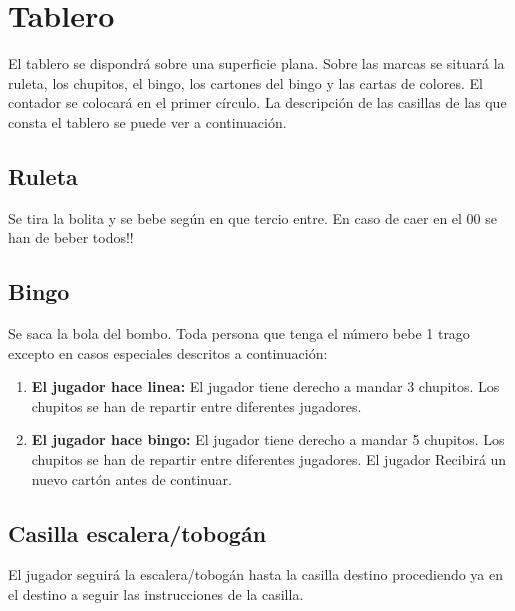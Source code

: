 \documentclass[10pt,a5paper]{article}
\begin{document}
\section{Tablero}\label{sec:casillas}
El tablero se dispondrá sobre una superficie plana. Sobre las marcas se situará la ruleta, los chupitos, el bingo, los cartones del bingo y las cartas de colores. El contador se colocará en el primer círculo.
La descripción de las casillas de las que consta el tablero se puede ver a continuación.

\subsection{Ruleta}
Se tira la bolita y se bebe según en que tercio entre. En caso de caer en el 00 se han de beber todos!!

\subsection{Bingo}
Se saca la bola del bombo. Toda persona que tenga el número bebe 1 trago excepto en casos especiales descritos a continuación:
\begin{enumerate}
	\item \textbf{El jugador hace linea:} El jugador tiene derecho a mandar 3 chupitos. Los chupitos se han de repartir entre diferentes jugadores.
	\item \textbf{El jugador hace bingo:} El jugador tiene derecho a mandar 5 chupitos. Los chupitos se han de repartir entre diferentes jugadores. El jugador Recibirá un nuevo cartón antes de continuar.
\end{enumerate}

\subsection{Casilla escalera/tobogán}
El jugador seguirá la escalera/tobogán hasta la casilla destino procediendo ya en el destino a seguir las instrucciones de la casilla.
\end{document}
